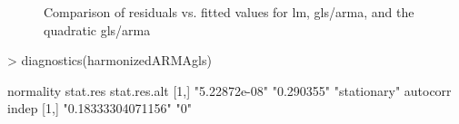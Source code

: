 \documentclass[10pt, a4paper]{article} %
\begin{document}
\begin{figure}[ht]
\begin{center}
\qquad
{}
\qquad
{}
\end{center}
\caption{Comparison of residuals vs. fitted values for lm, gls/arma, and the quadratic gls/arma}
\label{comparison_finalgls}
\end{figure}

\begin{Schunk}
\begin{Sinput}
> diagnostics(harmonizedARMAgls)
\end{Sinput}
\begin{Soutput}
     normality     stat.res   stat.res.alt
[1,] "5.22872e-08" "0.290355" "stationary"
     autocorr           indep
[1,] "0.18333304071156" "0"  
\end{Soutput}
\end{Schunk}
\end{document}
